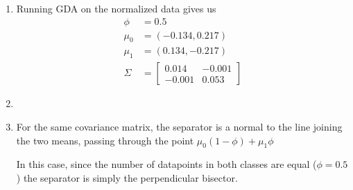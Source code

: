 \documentclass[12pt]{article}
\begin{document}
\begin{enumerate}[label=(\alph*)]
    \item Running GDA on the normalized data gives us 
    \begin{align*}
        \phi &= 0.5 \\
        \mu_0 &= (-0.134,0.217) \\
        \mu_1 &= (0.134,-0.217) \\
        \Sigma &= 
        \begin{bmatrix}
            0.014 & -0.001 \\
            -0.001 & 0.053
        \end{bmatrix}
    \end{align*}

    \item \begin{center}\end{center}

    \item For the same covariance matrix, the separator is a normal to the line joining the two means, passing through the point $\mu_0(1-\phi) + \mu_1\phi$

    In this case, since the number of datapoints in both classes are equal ($\phi = 0.5$) the separator is simply the perpendicular bisector.

    \begin{center}\end{center}


\end{enumerate}
\end{document}
